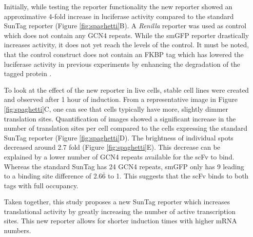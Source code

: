 Initially, while testing the reporter functionality the new reporter showed an approximative 4-fold increase in luciferase activity compared to the standard SunTag reporter (Figure \ref{fig:spaghetti}B).
A \textit{Renilla} reporter was used as control which does not contain any GCN4 repeats.
While the smGFP reporter drastically increases activity, it does not yet reach the levels of the control.
It must be noted, that the control construct does not contain an FKBP tag which has lowered the luciferase activity in previous experiments by enhancing the degradation of the tagged protein \cite{bonger_small_2011}.

To look at the effect of the new reporter in live cells, stable cell lines were created and observed after 1 hour of induction.
From a representative image in Figure \ref{fig:spaghetti}C, one can see that cells typically have more, slightly dimmer translation sites.
Quantification of images showed a significant increase in the number of translation sites per cell compared to the cells expressing the standard SunTag reporter (Figure \ref{fig:spaghetti}D).
The brightness of individual spots decreased around 2.7 fold (Figure \ref{fig:spaghetti}E).
This decrease can be explained by a lower number of GCN4 repeats available for the scFv to bind.
Whereas the standard SunTag has 24 GCN4 repeats, smGFP only has 9 leading to a binding site difference of 2.6$\overline{\mbox{6}}$ to 1.
This suggests that the scFv binds to both tags with full occupancy.

Taken together, this study proposes a new SunTag reporter which increases translational activity by greatly increasing the number of active transcription sites.
This new reporter allows for shorter induction times with higher mRNA numbers.

